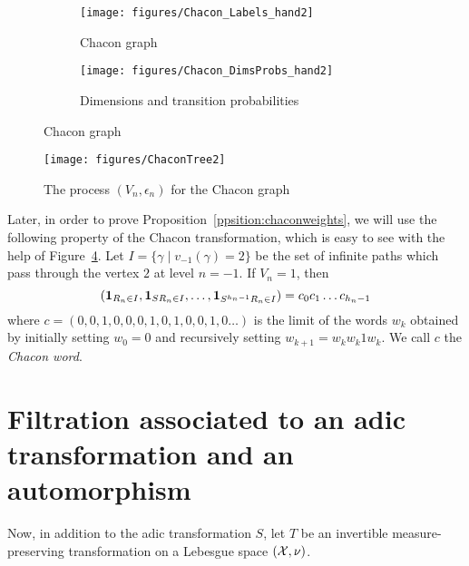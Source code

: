 \documentclass[12pt,a4paper]{article}
\begin{document}
\begin{figure}[!h]
   \centering
   \begin{subfigure}[t]{0.47\textwidth}
   \centering
   	\texttt{[image: figures/Chacon\_Labels\_hand2]}
 		\caption{\footnotesize Chacon graph}\label{fig:ChaconLabels}
    \end{subfigure}              
   \quad
    \begin{subfigure}[t]{0.47\textwidth}
    \centering
   	\texttt{[image: figures/Chacon\_DimsProbs\_hand2]}
 		\caption{\footnotesize Dimensions and transition probabilities}\label{fig:ChaconDimsProbs}
 	\end{subfigure}      

   \caption{Chacon graph}\label{fig:ChaconGraph}
 \end{figure}

\begin{figure}[!h]
\centering
	\texttt{[image: figures/ChaconTree2]}
\caption{The process $(V_n, \epsilon_n)$ for the Chacon graph}
\label{fig:ChaconProcess}
\end{figure}

Later, in order to prove Proposition~\ref{ppsition:chaconweights}, 
we will use the following property of the Chacon transformation, which is 
easy to see with the help of Figure~\ref{fig:ChaconProcess}. 
Let $I = \{\gamma \mid v_{-1}(\gamma)=2\}$ be the set of infinite paths 
which pass through the vertex $2$ at level $n=-1$. 
If $V_n=1$, then 
\begin{equation}\label{eq:ChaconWord}
(\boldsymbol 1_{R_n \in I}, \boldsymbol 1_{SR_n \in I}, \ldots, \boldsymbol 1_{S^{h_n-1}R_n \in I}) 
= c_0c_1\ldots c_{h_n-1}
\end{equation}
where $c = (0, 0, 1, 0, 0, 0, 1, 0, 1, 0, 0, 1, 0 \ldots)$ is the limit of 
the words $w_k$ obtained by initially setting $w_0=0$ and 
recursively setting $w_{k+1} = w_kw_k1w_k$. 
We call $c$ the \emph{Chacon word}. 

\section{Filtration associated to an adic transformation and an automorphism}


Now, in addition to the adic transformation $S$, let $T$ be an invertible 
 measure-preserving transformation on a Lebesgue space $(\mathcal{X}, \nu)$. 
\end{document}
